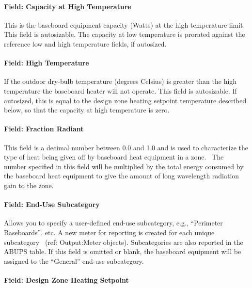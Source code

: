 \paragraph{Field: Capacity at High Temperature}\label{field-capacity-at-high-temperature}

This is the baseboard equipment capacity (Watts) at the high temperature limit. This field is autosizable. The capacity at low temperature is prorated against the reference low and high temperature fields, if autosized.

\paragraph{Field: High Temperature}\label{field-high-temperature}

If the outdoor dry-bulb temperature (degrees Celsius) is greater than the high temperature the baseboard heater will not operate. This field is autosizable. If autosized, this is equal to the design zone heating setpoint temperature described below, so that the capacity at high temperature is zero.

\paragraph{Field: Fraction Radiant}\label{field-fraction-radiant-7}

This field is a decimal number between 0.0 and 1.0 and is used to characterize the type of heat being given off by baseboard heat equipment in a zone.~ The number specified in this field will be multiplied by the total energy consumed by the baseboard heat equipment to give the amount of long wavelength radiation gain to the zone.

\paragraph{Field: End-Use Subcategory}\label{field-end-use-subcategory-5}

Allows you to specify a user-defined end-use subcategory, e.g., ``Perimeter Baseboards'', etc. A new meter for reporting is created for each unique subcategory~ (ref: Output:Meter objects). Subcategories are also reported in the ABUPS table. If this field is omitted or blank, the baseboard equipment will be assigned to the ``General'' end-use subcategory.

\paragraph{Field: Design Zone Heating Setpoint}\label{field-design-zone-heating-setpoint}

